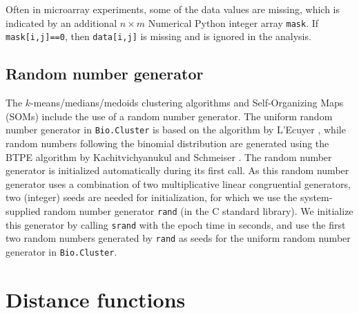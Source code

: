 \documentclass{report}
\begin{document}
Often in microarray experiments, some of the data values are missing, which is indicated by an additional $n \times m$ Numerical Python integer array \verb|mask|. If \verb|mask[i,j]==0|, then \verb|data[i,j]| is missing and is ignored in the analysis.

\subsection*{Random number generator}

The $k$-means/medians/medoids clustering algorithms and Self-Organizing Maps (SOMs) include the use of a random number generator. The uniform random number generator in \verb|Bio.Cluster| is based on the algorithm by L'Ecuyer \cite{lecuyer1988}, while random numbers following the binomial distribution are generated using the BTPE algorithm by Kachitvichyanukul and Schmeiser \cite{kachitvichyanukul1988}. The random number generator is initialized automatically during its first call. As this random number generator uses a combination of two multiplicative linear congruential generators, two (integer) seeds are needed for initialization, for which we use the system-supplied random number generator \verb|rand| (in the C standard library). We initialize this generator by calling \verb|srand| with the epoch time in seconds, and use the first two random numbers generated by \verb|rand| as seeds for the uniform random number generator in \verb|Bio.Cluster|.

\section{Distance functions}
\label{sec:distancefunctions}
\end{document}
